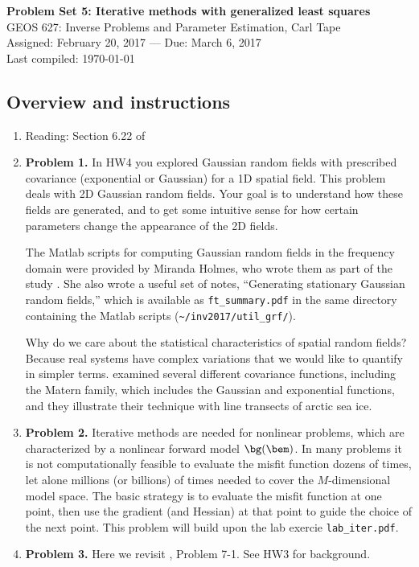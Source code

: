 \documentclass[11pt,titlepage,fleqn]{article}
\begin{document}
 

\begin{spacing}{1.2}
\centering
{\large \bf Problem Set 5: Iterative methods with generalized least squares} \\
GEOS 627: Inverse Problems and Parameter Estimation, Carl Tape \\
Assigned: February 20, 2017 --- Due: March 6, 2017 \\
Last compiled: \today
\end{spacing}


\subsection*{Overview and instructions}

\begin{enumerate}
\item Reading: Section 6.22 of \citet{Tarantola2005}

\item {\bf Problem 1.} In HW4 you explored Gaussian random fields with prescribed covariance (exponential or Gaussian) for a 1D spatial field. This problem deals with 2D Gaussian random fields. Your goal is to understand how these fields are generated, and to get some intuitive sense for how certain parameters change the appearance of the 2D fields.

The Matlab scripts for computing Gaussian random fields in the frequency domain were provided by Miranda Holmes, who wrote them as part of the study \citet{BuhlerHolmes2009}. She also wrote a useful set of notes, ``Generating stationary Gaussian random fields,'' which is available as \verb+ft_summary.pdf+ in the same directory containing the Matlab scripts (\verb+~/inv2017/util_grf/+).

Why do we care about the statistical characteristics of spatial random fields? Because real systems have complex variations that we would like to quantify in simpler terms. \citet{Gneiting2012} examined several different covariance functions, including the Matern family, which includes the Gaussian and exponential functions, and they illustrate their technique with line transects of arctic sea ice.

\item {\bf Problem 2.} Iterative methods are needed for nonlinear problems, which are characterized by a nonlinear forward model $\bg(\bem)$. In many problems it is not computationally feasible to evaluate the misfit function dozens of times, let alone millions (or billions) of times needed to cover the $M$-dimensional model space. The basic strategy is to evaluate the misfit function at one point, then use the gradient (and Hessian) at that point to guide the choice of the next point. This problem will build upon the lab exercie \verb+lab_iter.pdf+.

\item {\bf Problem 3.} Here we revisit \citet{Tarantola2005}, Problem 7-1. See HW3 for background.

\end{enumerate}
\end{document}

